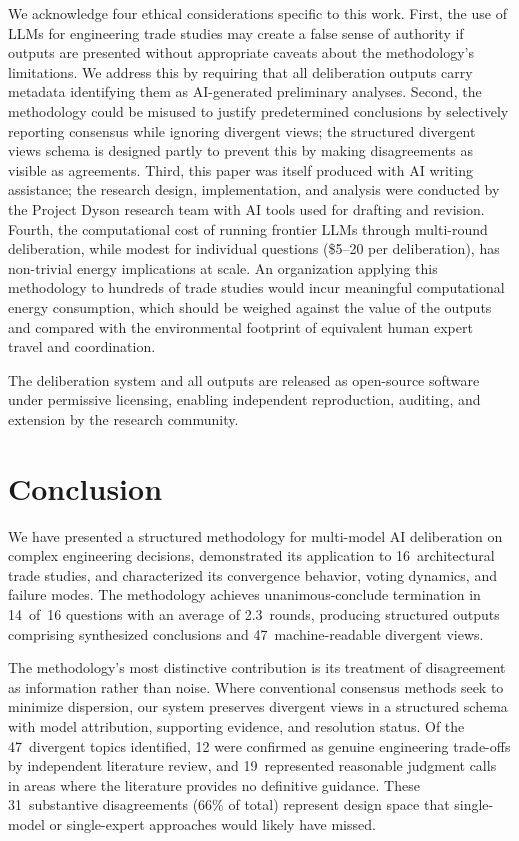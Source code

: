 \documentclass[11pt,a4paper]{article}
\begin{document}
We acknowledge four ethical considerations specific to this work. First, the use of LLMs for engineering trade studies may create a false sense of authority if outputs are presented without appropriate caveats about the methodology's limitations. We address this by requiring that all deliberation outputs carry metadata identifying them as AI-generated preliminary analyses. Second, the methodology could be misused to justify predetermined conclusions by selectively reporting consensus while ignoring divergent views; the structured divergent views schema is designed partly to prevent this by making disagreements as visible as agreements. Third, this paper was itself produced with AI writing assistance; the research design, implementation, and analysis were conducted by the Project Dyson research team with AI tools used for drafting and revision. Fourth, the computational cost of running frontier LLMs through multi-round deliberation, while modest for individual questions (\$5--20 per deliberation), has non-trivial energy implications at scale. An organization applying this methodology to hundreds of trade studies would incur meaningful computational energy consumption, which should be weighed against the value of the outputs and compared with the environmental footprint of equivalent human expert travel and coordination.

The deliberation system and all outputs are released as open-source software under permissive licensing, enabling independent reproduction, auditing, and extension by the research community.

\section{Conclusion}
\label{sec:conclusion}

We have presented a structured methodology for multi-model AI deliberation on complex engineering decisions, demonstrated its application to 16~architectural trade studies, and characterized its convergence behavior, voting dynamics, and failure modes. The methodology achieves unanimous-conclude termination in 14~of~16 questions with an average of 2.3~rounds, producing structured outputs comprising synthesized conclusions and 47~machine-readable divergent views.

The methodology's most distinctive contribution is its treatment of disagreement as information rather than noise. Where conventional consensus methods seek to minimize dispersion, our system preserves divergent views in a structured schema with model attribution, supporting evidence, and resolution status. Of the 47~divergent topics identified, 12 were confirmed as genuine engineering trade-offs by independent literature review, and 19~represented reasonable judgment calls in areas where the literature provides no definitive guidance. These 31~substantive disagreements (66\% of total) represent design space that single-model or single-expert approaches would likely have missed.
\end{document}
